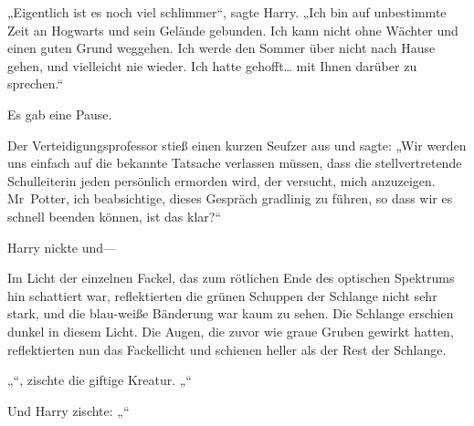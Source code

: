 „Eigentlich ist es noch viel schlimmer“, sagte Harry. „Ich bin auf unbestimmte Zeit an Hogwarts und sein Gelände gebunden. Ich kann nicht ohne Wächter und einen guten Grund weggehen. Ich werde den Sommer über nicht nach Hause gehen, und vielleicht nie wieder. Ich hatte gehofft… mit Ihnen darüber zu sprechen.“

Es gab eine Pause.

Der Verteidigungsprofessor stieß einen kurzen Seufzer aus und sagte: „Wir werden uns einfach auf die bekannte Tatsache verlassen müssen, dass die stellvertretende Schulleiterin jeden persönlich ermorden wird, der versucht, mich anzuzeigen. Mr~Potter, ich beabsichtige, dieses Gespräch gradlinig zu führen, so dass wir es schnell beenden können, ist das klar?“

Harry nickte und—

Im Licht der einzelnen Fackel, das zum rötlichen Ende des optischen Spektrums hin schattiert war, reflektierten die grünen Schuppen der Schlange nicht sehr stark, und die blau-weiße Bänderung war kaum zu sehen. Die Schlange erschien dunkel in diesem Licht. Die Augen, die zuvor wie graue Gruben gewirkt hatten, reflektierten nun das Fackellicht und schienen heller als der Rest der Schlange.

„“, zischte die giftige Kreatur. „“

Und Harry zischte: „“

